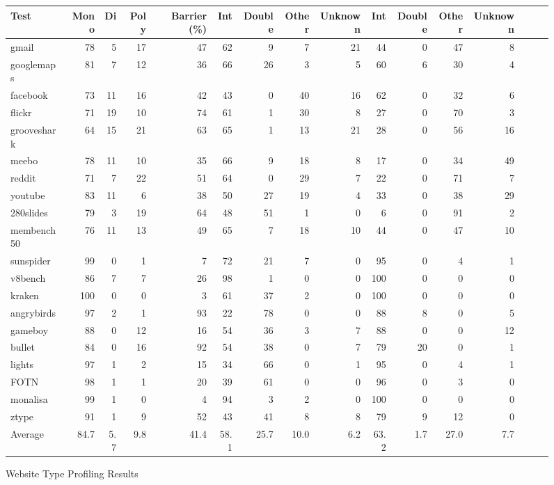 \begin{figure*}
\begin{tabular}{lrrrrrrrrrrrrrrr}
Test
& Mono & Di & Poly & Barrier (\%)
& Int & Double & Other & Unknown
& Int & Double & Other & Unknown \\
\midrule
gmail          & 78 & 5  & 17 & 47 & 62 & 9  & 7  & 21 & 44 & 0 & 47 & 8 \\
googlemaps     & 81 & 7  & 12 & 36 & 66 & 26 & 3  & 5  & 60 & 6 & 30 & 4 \\
facebook       & 73 & 11 & 16 & 42 & 43 & 0 & 40 & 16 & 62 & 0 & 32 & 6 \\
flickr         & 71 & 19 & 10 & 74 & 61 & 1 & 30 & 8 & 27 & 0 & 70 & 3 \\
grooveshark    & 64 & 15 & 21 & 63 & 65 & 1 & 13 & 21 & 28 & 0 & 56 & 16 \\
meebo          & 78 & 11 & 10 & 35 & 66 & 9 & 18 & 8 & 17 & 0 & 34 & 49 \\
reddit         & 71 & 7 & 22 & 51 & 64 & 0 & 29 & 7 & 22 & 0 & 71 & 7 \\
youtube        & 83 & 11 & 6 & 38 & 50 & 27 & 19 & 4 & 33 & 0 & 38 & 29 \\
280slides      & 79 & 3 & 19 & 64 & 48 & 51 & 1 & 0 & 6 & 0 & 91 & 2 \\
membench50     & 76 & 11 & 13 & 49 & 65 & 7  & 18 & 10 & 44 & 0 & 47 & 10 \\
\midrule
sunspider      & 99 & 0  & 1  & 7  & 72 & 21 & 7  & 0  & 95 & 0 & 4  & 1  \\
v8bench        & 86 & 7  & 7  & 26 & 98 & 1  & 0  & 0  & 100 & 0 & 0 & 0  \\
kraken         & 100 & 0 & 0  & 3  & 61 & 37 & 2  & 0  & 100 & 0 & 0 & 0  \\
\midrule
angrybirds     & 97 & 2 & 1 & 93 & 22 & 78 & 0 & 0 & 88 & 8 & 0 & 5 \\
gameboy        & 88 & 0 & 12 & 16 & 54 & 36 & 3 & 7 & 88 & 0 & 0 & 12 \\
bullet         & 84 & 0 & 16 & 92 & 54 & 38 & 0 & 7 & 79 & 20 & 0 & 1 \\
lights         & 97 & 1 & 2 & 15 & 34 & 66 & 0 & 1 & 95 & 0 & 4 & 1 \\
FOTN           & 98 & 1 & 1 & 20 & 39 & 61 & 0 & 0 & 96 & 0 & 3 & 0 \\
monalisa       & 99 & 1 & 0 & 4 & 94 & 3 & 2 & 0 & 100 & 0 & 0 & 0 \\
ztype          & 91 & 1 & 9 & 52 & 43 & 41 & 8 & 8 & 79 & 9 & 12 & 0 \\
\midrule
Average        & 84.7 & 5.7 & 9.8 & 41.4 & 58.1 & 25.7 & 10.0 & 6.2 & 63.2 & 1.7 & 27.0 & 7.7 \\
\bottomrule
\end{tabular}
\nocaptionrule \caption{Website Type Profiling Results}
\label{fig:polymorphism}
\end{figure*}

